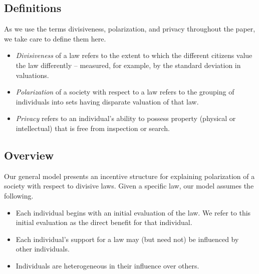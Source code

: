 \subsection{Definitions}
As we use the terms divisiveness, polarization, and privacy throughout the paper, we take care to define them here.

\begin{itemize}
\item  \emph{Divisiveness} of a law refers to the extent to which the different citizens value the law differently -- measured, for example, by the standard deviation in valuations.

\item \emph{Polarization} of a society with respect to a law refers to the grouping of individuals into sets having disparate valuation of that law. %

\item \emph{Privacy} refers to an individual's ability to possess property (physical or intellectual) that is free from inspection or search. %

\end{itemize}

\subsection{Overview}
Our general model presents an incentive structure for explaining polarization of a society with respect to divisive laws. Given a specific law, our model assumes the following. 
\begin{itemize}
\item Each individual begins with an initial evaluation of the law. We refer to this initial evaluation as the direct benefit for that individual.
\item Each individual's support for a law may (but need not) be influenced by other individuals.
\item Individuals are heterogeneous in their influence over others.
\end{itemize}


